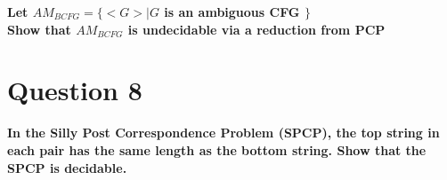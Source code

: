 \documentclass{article}
\begin{document}
\textbf{Let $AM_{BCFG} = \{< G > | G$ is an ambiguous CFG $\}$ \\
    Show that $AM_{BCFG}$ is undecidable via a reduction from PCP\\}

\pagebreak


\section{Question 8}
\textbf{In the Silly Post Correspondence Problem (SPCP), the top string in each pair has the same
length as the bottom string. Show that the SPCP is decidable.\\}

\pagebreak
\end{document}
